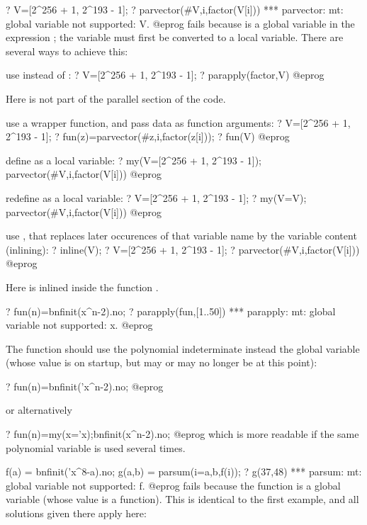 \bprog
? V=[2^256 + 1, 2^193 - 1];
? parvector(#V,i,factor(V[i]))
  *** parvector: mt: global variable not supported: V.
@eprog\noindent
fails because  is a global variable in the expression
; the variable  must first be converted to a local
variable. There are several ways to achieve this:

\item use  instead of :
\bprog
? V=[2^256 + 1, 2^193 - 1];
? parapply(factor,V)
@eprog

Here  is not part of the parallel section of the code.

\item use a wrapper function, and pass data as function arguments:
\bprog
? V=[2^256 + 1, 2^193 - 1];
? fun(z)=parvector(#z,i,factor(z[i]));
? fun(V)
@eprog

\item define  as a local variable:
\bprog
? my(V=[2^256 + 1, 2^193 - 1]); parvector(#V,i,factor(V[i]))
@eprog

\item redefine  as a local variable:
\bprog
? V=[2^256 + 1, 2^193 - 1];
? my(V=V); parvector(#V,i,factor(V[i]))
@eprog

\item use , that replaces later occurences of that variable name
  by the variable content (inlining):
\bprog
? inline(V);
? V=[2^256 + 1, 2^193 - 1];
? parvector(#V,i,factor(V[i]))
@eprog

Here  is inlined inside the function .


\bprog
? fun(n)=bnfinit(x^n-2).no;
? parapply(fun,[1..50])
  *** parapply: mt: global variable not supported: x.
@eprog

The function  should use the polynomial indeterminate 
instead the global variable  (whose value is  on startup, but
may or may no longer be  at this point):

\bprog
? fun(n)=bnfinit('x^n-2).no;
@eprog

or alternatively

\bprog
? fun(n)=my(x='x);bnfinit(x^n-2).no;
@eprog
which is more readable if the same polynomial variable is used several times.

\bprog
f(a) = bnfinit('x^8-a).no;
g(a,b) = parsum(i=a,b,f(i));
? g(37,48)
  *** parsum: mt: global variable not supported: f.
@eprog\noindent
fails because the function  is a global variable (whose value is a
function).  This is identical to the first example, and all solutions given
there apply here:

